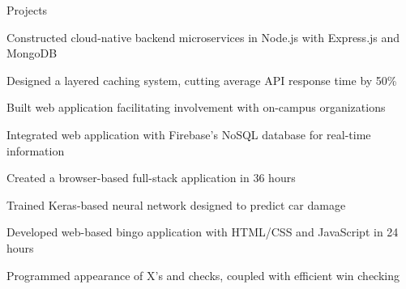 \documentclass{resume} %
\begin{document}
\begin{rSection}{Projects}

 \smallskip
\begin{rList}
\item Constructed cloud-native backend microservices in Node.js with Express.js
    and MongoDB
\item Designed a layered caching system, cutting average API response time by
    50\%
\end{rList}
\vspace{0.5em}


 \smallskip
\begin{rList}
\item Built web application facilitating involvement with on-campus 
    organizations
\item Integrated web application with Firebase’s NoSQL database for real-time
    information
\end{rList}
\vspace{0.5em}


 \smallskip
\begin{rList}
\item Created a browser-based full-stack application in 36 hours
\item Trained Keras-based neural network designed to predict car damage
\end{rList}
\vspace{0.5em}


 \smallskip
\begin{rList}
\item Developed web-based bingo application with HTML/CSS and JavaScript in 24 
    hours
\item Programmed appearance of X’s and checks, coupled with efficient win 
    checking 
\end{rList}

\end{rSection}

\end{document}
